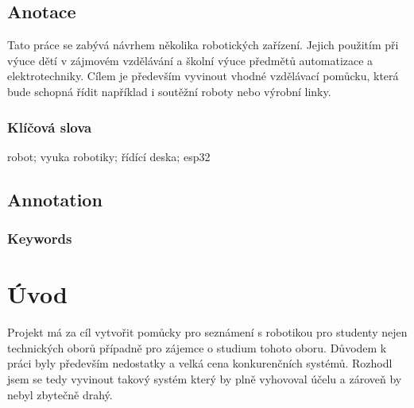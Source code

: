 \documentclass{template/socthesis}
\author{Tomas Vavrinec}
\begin{document}
\maketitle



\pagestyle{empty}

\section*{Anotace}
Tato práce se zabývá návrhem několika robotických zařízení. Jejich použitím při výuce dětí v zájmovém vzdělávání a školní výuce předmětů automatizace a elektrotechniky.
Cílem je především vyvinout vhodné vzdělávací pomůcku, která bude schopná řídit například i soutěžní roboty nebo výrobní linky.


\subsection*{Klíčová slova}
robot; vyuka robotiky; řídící deska; esp32

\vspace{20mm}

\section*{Annotation}

\subsection*{Keywords}

\newpage
\pagestyle{plain}

\tableofcontents %

\setcounter{figure}{0}
\setcounter{table}{0}
\newpage

\chapter*{Úvod}
Projekt má za cíl vytvořit pomůcky pro seznámení s robotikou pro studenty nejen technických oborů případně pro zájemce o studium tohoto oboru. Důvodem k práci byly především nedostatky a velká cena konkurenčních systémů. Rozhodl jsem se tedy vyvinout takový systém který by plně vyhovoval účelu a zároveň by nebyl zbytečně drahý.
\end{document}
